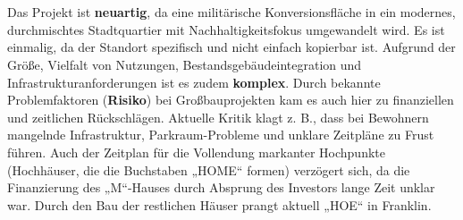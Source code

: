 \documentclass{article}
\begin{document}
\\  \\
Das Projekt ist \textbf{neuartig}, da eine militärische Konversionsfläche in ein modernes, durchmischtes Stadtquartier mit Nachhaltigkeitsfokus umgewandelt wird. 
Es ist einmalig, da der Standort spezifisch und nicht einfach kopierbar ist. 
Aufgrund der Größe, Vielfalt von Nutzungen, Bestandsgebäudeintegration und Infrastrukturanforderungen ist es zudem \textbf{komplex}. 
Durch bekannte Problemfaktoren (\textbf{Risiko}) bei Großbauprojekten kam es auch hier zu finanziellen und zeitlichen Rückschlägen. 
Aktuelle Kritik klagt z. B., dass bei Bewohnern mangelnde Infrastruktur, Parkraum-Probleme und unklare Zeitpläne zu Frust führen. 
Auch der Zeitplan für die Vollendung markanter Hochpunkte (Hochhäuser, die die Buchstaben „HOME“ formen) verzögert sich, 
da die Finanzierung des „M“-Hauses durch Absprung des Investors lange Zeit unklar war. Durch den Bau der restlichen Häuser prangt aktuell „HOE“ in Franklin.

\clearpage

\end{document}
